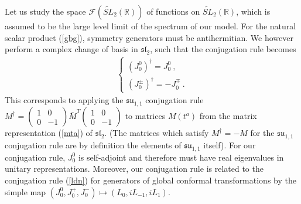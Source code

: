 \documentclass[12pt,a4paper,notitlepage]{report}
\numberwithin{equation}{section}
\theoremstyle{break}
\begin{document}
Let us study the space $\mathcal{F}(\widetilde{SL}_2(\mathbb{R}))$ of functions on $\widetilde{SL}_2(\mathbb{R})$, which is assumed to be the large level limit of the spectrum of our model. 
For the natural scalar product (\ref{gbg}), symmetry generators must be antihermitian. We however perform a complex change of basis in $\mathfrak{sl}_2$, such that the conjugation rule becomes
\begin{align}
 \left\{\begin{array}{l} (J_0^0)^\dagger = J_0^0\ , \\
         (J_0^\pm)^\dagger = -J_0^\mp \ .
        \end{array}
\right.
\label{jtdj}
\end{align}
This corresponds to applying the $\mathfrak{su}_{1,1}$ conjugation rule $M^\dagger = \left(\begin{smallmatrix} 1 & 0 \\ 0 & -1 \end{smallmatrix}\right) \bar{M}^T \left(\begin{smallmatrix} 1 & 0 \\ 0 & -1 \end{smallmatrix}\right)$ to matrices $M(t^a)$ from the matrix representation (\ref{mta}) of $\mathfrak{sl}_2$. (The matrices which satisfy $M^\dagger =-M$ for the $\mathfrak{su}_{1,1}$ conjugation rule are by definition the elements of $\mathfrak{su}_{1,1}$ itself). 
For our conjugation rule, $J_0^0$ is self-adjoint and therefore must have real eigenvalues in unitary representations. Moreover, our conjugation rule is related to the conjugation rule (\ref{ldn}) for generators of 
global conformal transformations by the simple map $(J_0^0,J_0^+,J_0^-)\mapsto(L_0,iL_{-1},iL_1)$.
\end{document}
